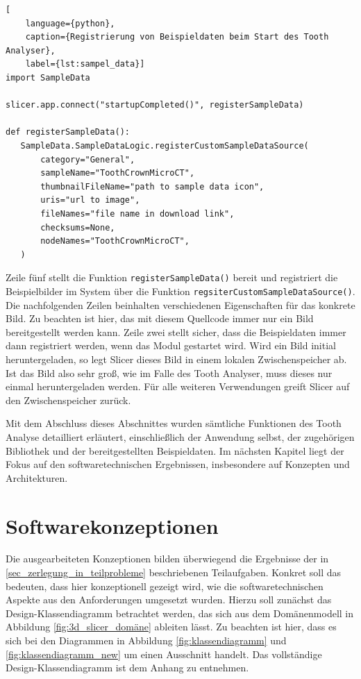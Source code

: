 \begin{lstlisting}[
    language={python},
    caption={Registrierung von Beispieldaten beim Start des Tooth Analyser},
    label={lst:sampel_data}]
import SampleData

slicer.app.connect("startupCompleted()", registerSampleData)

def registerSampleData():
   SampleData.SampleDataLogic.registerCustomSampleDataSource(
	   category="General",
	   sampleName="ToothCrownMicroCT",
	   thumbnailFileName="path to sample data icon",
	   uris="url to image",
	   fileNames="file name in download link",
	   checksums=None,
	   nodeNames="ToothCrownMicroCT",
   )
\end{lstlisting}

Zeile fünf stellt die Funktion \texttt{registerSampleData()} bereit und registriert
die Beispielbilder im System über die Funktion \texttt{regsiterCustomSampleDataSource()}.
Die nachfolgenden Zeilen beinhalten verschiedenen Eigenschaften für das konkrete
Bild. Zu beachten ist hier, das mit diesem Quellcode immer nur ein Bild bereitgestellt
werden kann. Zeile zwei stellt sicher, dass die Beispieldaten immer dann registriert
werden, wenn das Modul gestartet wird. Wird ein Bild initial heruntergeladen, so
legt Slicer dieses Bild in einem lokalen Zwischenspeicher ab. Ist das Bild also sehr
groß, wie im Falle des Tooth Analyser, muss dieses nur einmal heruntergeladen werden.
Für alle weiteren Verwendungen greift Slicer auf den Zwischenspeicher zurück.

Mit dem Abschluss dieses Abschnittes wurden sämtliche Funktionen des Tooth
Analyse detailliert erläutert, einschließlich der Anwendung selbst, der
zugehörigen Bibliothek und der bereitgestellten Beispieldaten. Im nächsten Kapitel
liegt der Fokus auf den softwaretechnischen Ergebnissen, insbesondere auf
Konzepten und Architekturen.

\pagebreak

\section{Softwarekonzeptionen}
\label{sec:konzeptionen} Die ausgearbeiteten Konzeptionen bilden überwiegend die
Ergebnisse der in \ref{sec_zerlegung_in_teilprobleme} beschriebenen Teilaufgaben.
Konkret soll das bedeuten, dass hier konzeptionell gezeigt wird, wie die
softwaretechnischen Aspekte aus den Anforderungen umgesetzt wurden. Hierzu soll zunächst
das Design-Klassendiagramm betrachtet werden, das sich aus dem Domänenmodell in
Abbildung \ref{fig:3d_slicer_domäne} ableiten lässt. Zu beachten ist hier, dass
es sich bei den Diagrammen in Abbildung \ref{fig:klassendiagramm} und
\ref{fig:klassendiagramm_new} um einen Ausschnitt handelt. Das vollständige Design-Klassendiagramm
ist dem Anhang zu entnehmen.

